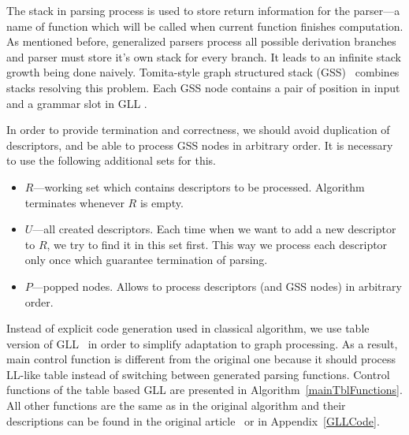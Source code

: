 The stack in parsing process is used to store return information for the parser---a name of function which will be called when current function finishes computation. 
As mentioned before, generalized parsers process all possible derivation branches and parser must store it's own stack for every branch. 
It leads to an infinite stack growth being done naively.  
Tomita-style graph structured stack (GSS)~\cite{Tomita} combines stacks resolving this problem.
Each GSS node contains a pair of position in input and a grammar slot in GLL . 

In order to provide termination and correctness, we should avoid duplication of descriptors, and be able to process GSS nodes in arbitrary order. It is necessary to use the following additional sets for this.
\begin{itemize}
\item $R$---working set which contains descriptors to be processed. Algorithm terminates whenever $R$ is empty.
\item $U$---all created descriptors. Each time when we want to add a new descriptor to $R$, we try to find it in this set first.
This way we process each descriptor only once which guarantee termination of parsing.
\item $P$---popped nodes. Allows to process descriptors (and GSS nodes) in arbitrary order. 
\end{itemize}

Instead of explicit code generation used in classical algorithm, we use table version of GLL~\cite{TableGLL} in order to simplify adaptation to graph processing.
As a result, main control function is different from the original one because it should process LL-like table instead of switching between generated parsing functions.
Control functions of the table based GLL are presented in Algorithm~\ref{mainTblFunctions}.
All other functions are the same as in the original algorithm and their descriptions can be found in the original article~\cite{scott2010gll} or in Appendix~\ref{GLLCode}.

